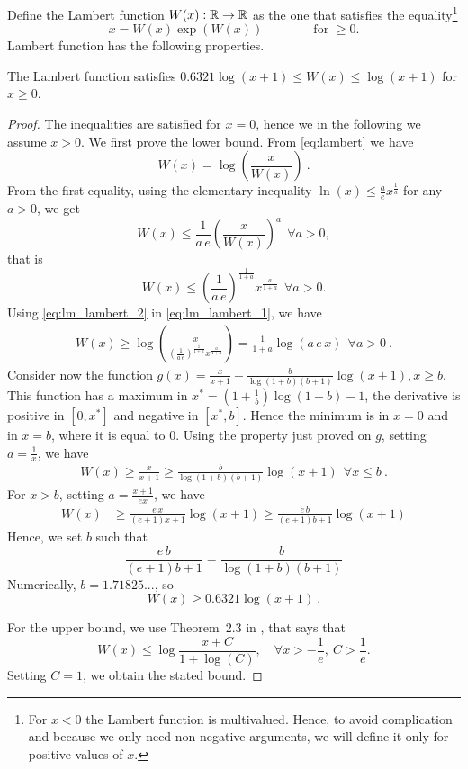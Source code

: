 Define the Lambert function $W(x):\mathbb{R}\rightarrow\mathbb{R}$ as the one that satisfies
the equality\footnote{For $x<0$ the Lambert function is multivalued. Hence, to
avoid complication and because we only need non-negative arguments, we will
define it only for positive values of $x$.}
\begin{equation}
\label{eq:lambert}
x=W(x) \exp \left(W(x)\right) \qquad \qquad \text{for $\ge 0$}.
\end{equation}
Lambert function has the following properties.
%
\begin{lemma}
\label{lemma:lambert}
The Lambert function satisfies $0.6321 \log(x+1) \leq W(x) \leq \log(x+1)$ for $x \ge 0$.
\end{lemma}
%
\begin{proof}
The inequalities are satisfied for $x=0$, hence we in the following we assume $x>0$.
We first prove the lower bound. From \eqref{eq:lambert} we have
\begin{equation}
W(x) = \log\left(\frac{x}{W(x)}\right)~. \label{eq:lm_lambert_1}
\end{equation}
From the first equality, using the elementary inequality $\ln (x) \leq \frac{a}{e} x^\frac{1}{a}$ for any $a>0$, we get
\[
W(x) \leq \frac{1}{a\, e}\left(\frac{x}{W(x)}\right)^a  \ \ \forall a>0,
\]
that is
\begin{equation}
\label{eq:lm_lambert_2}
W(x) \leq \left(\frac{1}{a\, e}\right)^\frac{1}{1+a} x^\frac{a}{1+a} \ \ \forall a>0.
\end{equation}
Using \eqref{eq:lm_lambert_2} in \eqref{eq:lm_lambert_1}, we have
\begin{align*}
W(x)
\geq \log\left(\frac{x}{\left(\frac{1}{a\, e}\right)^\frac{1}{1+a} x^\frac{a}{1+a}}\right)
= \frac{1}{1+a}\log\left(a \, e\, x\right) \ \ \forall a>0~.
\end{align*}
Consider now the function $g(x)=\frac{x}{x+1} - \frac{b}{\log(1+b) (b+1)}
\log(x+1), x\geq b$. This function has a maximum in $x^*=(1+\frac{1}{b})
\log(1+b)-1$, the derivative is positive in $[0,x^*]$ and negative in
$[x^*,b]$. Hence the minimum is in $x=0$ and in $x=b$, where it is equal to
$0$.  Using the property just proved on $g$, setting $a=\frac{1}{x}$, we have
\begin{align*}
W(x)
\geq \frac{x}{x+1} \geq \frac{b}{\log(1+b) (b+1)} \log(x+1) \ \  \forall x\leq b~.
\end{align*}
For $x>b$, setting $a=\frac{x+1}{e x}$, we have
\begin{align}
W(x)
&\geq \frac{e\,x}{(e+1) x + 1} \log(x+1) \geq \frac{e\,b}{(e+1) b + 1} \log(x+1)
\end{align}
Hence, we set $b$ such that
\[
\frac{e\, b}{(e+1)b + 1} = \frac{b}{\log(1+b) (b+1)}
\]
Numerically, $b=1.71825...$, so
\[
W(x) \geq 0.6321 \log(x+1)~.
\]

For the upper bound, we use Theorem~2.3 in \cite{hoorfar2008inequalities}, that says that
\[
W(x) \leq \log\frac{x+C}{1+\log(C)}, \quad \forall x> -\frac{1}{e}, \ C>\frac{1}{e}.
\]
Setting $C=1$, we obtain the stated bound.
\end{proof}

